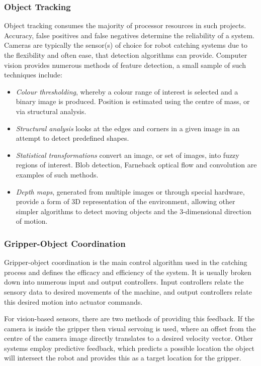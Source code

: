 \documentclass[conference]{IEEEtran}
\begin{document}
\subsubsection{Object Tracking}
Object tracking consumes the majority of processor resources in such projects. Accuracy, false positives and false negatives determine the reliability of a system. Cameras are typically the sensor(s) of choice for robot catching systems due to the flexibility and often ease, that detection algorithms can provide. Computer vision provides numerous methods of feature detection, a small sample of such techniques include:
\begin{itemize}
	\item \textit{Colour thresholding}, whereby a colour range of interest is selected and a binary image is produced. Position is estimated using the centre of mass, or via structural analysis.
	\item \textit{Structural analysis} looks at the edges and corners in a given image in an attempt to detect predefined shapes.
	\item \textit{Statistical transformations} convert an image, or set of images, into fuzzy regions of interest. Blob detection, Farneback optical flow and convolution are examples of such methods.
	\item \textit{Depth maps}, generated from multiple images or through special hardware, provide a form of 3D representation of the environment, allowing other simpler algorithms to detect moving objects and the 3-dimensional direction of motion.
\end{itemize}
\subsubsection{Gripper-Object Coordination}
Gripper-object coordination is the main control algorithm used in the catching process and defines the efficacy and efficiency of the system. It is usually broken down into numerous input and output controllers. Input controllers relate the sensory data to desired movements of the machine, and output controllers relate this desired motion into actuator commands.

For vision-based sensors, there are two methods of providing this feedback. If the camera is inside the gripper then visual servoing is used, where an offset from the centre of the camera image directly translates to a desired velocity vector. Other systems employ predictive feedback, which predicts a possible location the object will intersect the robot and provides this as a target location for the gripper.
\end{document}
